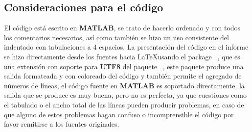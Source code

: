 
\subsection{Consideraciones para el código}
\thispagestyle{codeconsstyle}
\renewcommand{\themark}{Consideraciones para el código}
El código está escrito en \textbf{MATLAB}, se trato de hacerlo ordenado y con todos los comentarios necesarios, así como también se hizo un uso consistente del indentado con tabulaciones a 4 espacios. La presentación del código en el informe se hizo directamente desde los fuentes hacia \LaTeX\space usando el package \textbf{}~\cite{The_ListingsUTF8_Package}, que es una extensión con soporte para \textbf{UTF8} del paquete \textbf{}~\cite{The_Listings_Package}, este paquete produce una salida formateada y con coloreado del código y también permite el agregado de números de líneas, el código fuente en \textbf{MATLAB} es soportado directamente, la salida que se produce es muy buena, pero no es perfecta, ya que cuestiones como el tabulado o el ancho total de las líneas pueden producir problemas, en caso de que alguno de estos problemas hagan confuso o incomprensible el código por favor remitirse a los fuentes originales. 
 

\clearpage




\lstset{showspaces=false}
\lstset{showstringspaces=false}



\lstset{tabsize=4}

